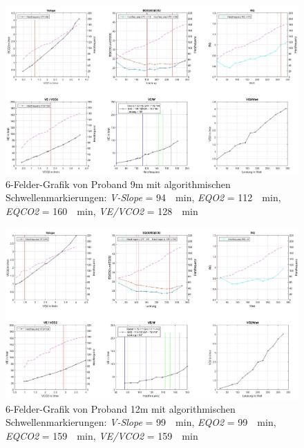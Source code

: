 %
\begin{figure}[H]
	\centering
	\noindent\includegraphics[angle=0,width=\linewidth,keepaspectratio]{Bilder/auto_9}
	\caption[6-Felder-Grafik von Proband 9m mit algorithmischen Schwellenmarkierungen]{6-Felder-Grafik von Proband 9m mit algorithmischen Schwellenmarkierungen: \textsl{V-Slope} = \SI{94}{\per\minute}, \textsl{\acs{EQO2}} = \SI{112}{\per\minute}, \textsl{\acs{EQCO2}} = \SI{160}{\per\minute}, \textsl{\acs{VE}/\acs{VCO2}} = \SI{128}{\per\minute}}
	\label{pic:pic19}
\end{figure}
%
\begin{figure}[H]
	\centering
	\noindent\includegraphics[angle=0,width=\linewidth,keepaspectratio]{Bilder/auto_12}
	\caption[6-Felder-Grafik von Proband 12m mit algorithmischen Schwellenmarkierungen]{6-Felder-Grafik von Proband 12m mit algorithmischen Schwellenmarkierungen: \textsl{V-Slope} = \SI{99}{\per\minute}, \textsl{\acs{EQO2}} = \SI{99}{\per\minute}, \textsl{\acs{EQCO2}} = \SI{159}{\per\minute}, \textsl{\acs{VE}/\acs{VCO2}} = \SI{159}{\per\minute}}
	\label{pic:pic20}
\end{figure}
